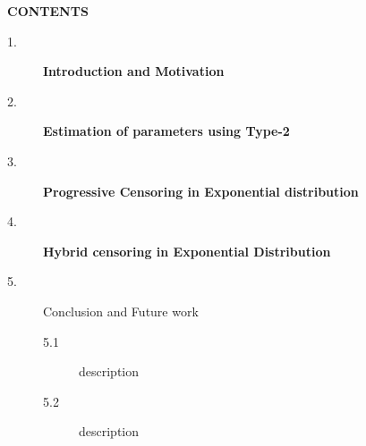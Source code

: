 \documentclass[12pt]{article}
\begin{document}
\newpage
\vspace{0.5cm}
\begin{center}
\textbf{\Large CONTENTS}
\end{center}
\begin{description}
     \item[1.] \textbf{Introduction and Motivation}
     \item[2.] \textbf{Estimation of parameters using Type-2}
     \item[3.] \textbf{Progressive Censoring in Exponential distribution}
     \item[4.] \textbf{Hybrid censoring in Exponential Distribution}
     \item[5.] Conclusion and Future work
      \begin{description}
	   \item[5.1] description
	   \item[5.2] description
      \end{description} 
\end{description}
\end{document}
